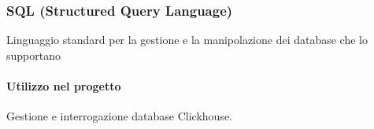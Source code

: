 \subsubsection{SQL (Structured Query Language)}
Linguaggio standard per la gestione e la manipolazione dei
database che lo supportano

\paragraph{Utilizzo nel progetto}
Gestione e interrogazione database Clickhouse.

